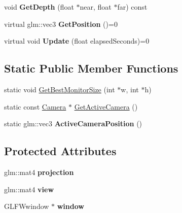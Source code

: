 \begin{DoxyCompactItemize}
\item 
\hypertarget{class_camera_a8724d0635baf62345007b7c2bf0efb79}{void {\bfseries Get\-Depth} (float $\ast$near, float $\ast$far) const }\label{class_camera_a8724d0635baf62345007b7c2bf0efb79}

\item 
\hypertarget{class_camera_a3beb7b2b200f57c556f87b0447d2d201}{virtual glm\-::vec3 {\bfseries Get\-Position} ()=0}\label{class_camera_a3beb7b2b200f57c556f87b0447d2d201}

\item 
\hypertarget{class_camera_aee7dcbe0dd7727a229f6c8f2d28bed17}{virtual void {\bfseries Update} (float elapsed\-Seconds)=0}\label{class_camera_aee7dcbe0dd7727a229f6c8f2d28bed17}

\end{DoxyCompactItemize}
\subsection*{Static Public Member Functions}
\begin{DoxyCompactItemize}
\item 
static void \hyperlink{class_camera_a6c30d2ff4b33d5567966efe02ccaaf4c}{Get\-Best\-Monitor\-Size} (int $\ast$w, int $\ast$h)
\item 
static const \hyperlink{class_camera}{Camera} $\ast$ \hyperlink{class_camera_a9bcca5c398086a9a81a144181bb26b51}{Get\-Active\-Camera} ()
\item 
\hypertarget{class_camera_a6c9d0c83669374cbd4de24c423c4c89f}{static glm\-::vec3 {\bfseries Active\-Camera\-Position} ()}\label{class_camera_a6c9d0c83669374cbd4de24c423c4c89f}

\end{DoxyCompactItemize}
\subsection*{Protected Attributes}
\begin{DoxyCompactItemize}
\item 
\hypertarget{class_camera_a43555a0ae83f9ec696ee257e5fd48cf2}{glm\-::mat4 {\bfseries projection}}\label{class_camera_a43555a0ae83f9ec696ee257e5fd48cf2}

\item 
\hypertarget{class_camera_add93fedd6b9a6a6e2c784aeda624de83}{glm\-::mat4 {\bfseries view}}\label{class_camera_add93fedd6b9a6a6e2c784aeda624de83}

\item 
\hypertarget{class_camera_a9045e1a5a610020d85b4bb9d63a82ab1}{G\-L\-F\-Wwindow $\ast$ {\bfseries window}}\label{class_camera_a9045e1a5a610020d85b4bb9d63a82ab1}

\end{DoxyCompactItemize}



